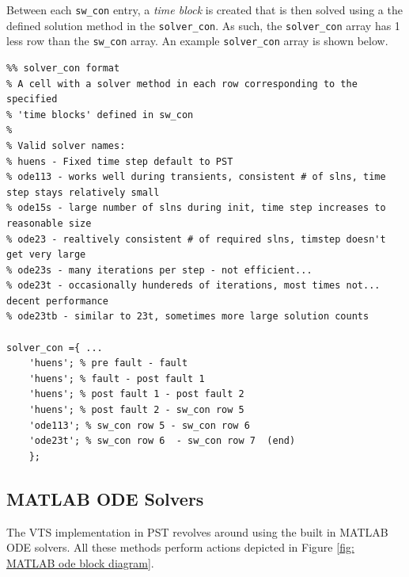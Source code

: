 Between each \verb|sw_con| entry, a \emph{time block} is created that is then solved using a the defined solution method in the \verb|solver_con|.
As such, the \verb|solver_con| array has 1 less row than the \verb|sw_con| array.
An example \verb|solver_con| array is shown below.
\begin{verbatim}
%% solver_con format
% A cell with a solver method in each row corresponding to the specified
% 'time blocks' defined in sw_con
%
% Valid solver names:
% huens - Fixed time step default to PST
% ode113 - works well during transients, consistent # of slns, time step stays relatively small
% ode15s - large number of slns during init, time step increases to reasonable size
% ode23 - realtively consistent # of required slns, timstep doesn't get very large
% ode23s - many iterations per step - not efficient...
% ode23t - occasionally hundereds of iterations, most times not... decent performance
% ode23tb - similar to 23t, sometimes more large solution counts

solver_con ={ ...
    'huens'; % pre fault - fault
    'huens'; % fault - post fault 1
    'huens'; % post fault 1 - post fault 2
    'huens'; % post fault 2 - sw_con row 5
    'ode113'; % sw_con row 5 - sw_con row 6 
    'ode23t'; % sw_con row 6  - sw_con row 7  (end)
    };
\end{verbatim}


\subsection{MATLAB ODE Solvers}
The VTS implementation in PST revolves around using the built in MATLAB ODE solvers.
All these methods perform actions depicted in Figure \ref{fig: MATLAB ode block diagram}.


